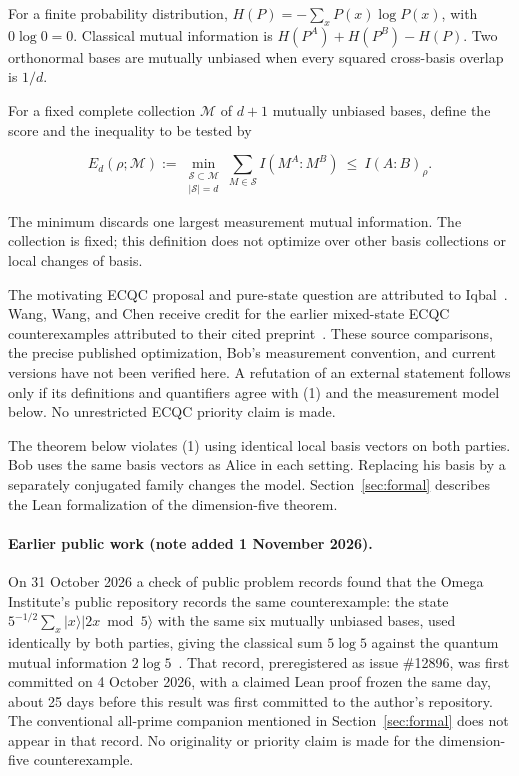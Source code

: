 \documentclass[11pt,a4paper]{article}
\begin{document}
For a finite probability distribution, $H(P)=-\sum_x P(x)\log P(x)$,
with $0\log0=0$. Classical mutual information is
$H(P^A)+H(P^B)-H(P)$. Two orthonormal bases are mutually unbiased when
every squared cross-basis overlap is $1/d$.

For a fixed complete collection \(\mathcal M\) of \(d+1\) mutually
unbiased bases, define the score and the inequality to be tested by

\[
 E_d(\rho;\mathcal M):=
 \min_{\substack{\mathcal S\subset\mathcal M\\|\mathcal S|=d}}
 \sum_{M\in\mathcal S}I(M^A:M^B)
 \ \le\ I(A:B)_\rho.
 \tag{1}
\]

The minimum discards one largest measurement mutual information. The
collection is fixed; this definition does not optimize over other basis
collections or local changes of basis.

The motivating ECQC proposal and pure-state question are attributed to
Iqbal~\cite{Iqbal}. Wang, Wang, and Chen receive credit for the earlier
mixed-state ECQC counterexamples attributed to their cited
preprint~\cite{WangECQC}. These source comparisons, the precise published
optimization, Bob's measurement convention, and current versions have
not been verified here. A refutation of an external statement follows
only if its definitions and quantifiers agree with (1) and the measurement
model below. No unrestricted ECQC priority claim is made.

The theorem below violates (1) using identical local basis vectors on
both parties. Bob uses the same basis vectors as Alice in each setting.
Replacing his basis by a separately conjugated family changes the model.
Section~\ref{sec:formal} describes the Lean formalization of the
dimension-five theorem.

\paragraph{Earlier public work (note added 1 November 2026).}
On 31 October 2026 a check of public problem records found that the Omega
Institute's public repository records the same counterexample: the state
$5^{-1/2}\sum_x|x\rangle|2x \bmod 5\rangle$ with the same six mutually
unbiased bases, used identically by both parties, giving the classical sum
$5\log5$ against the quantum mutual information
$2\log5$~\cite{OmegaECQC}. That record, preregistered as issue \#12896, was
first committed on 4 October 2026, with a claimed Lean proof frozen the
same day, about 25 days before this result was first committed to the
author's repository. The conventional all-prime companion mentioned in
Section~\ref{sec:formal} does not appear in that record. No originality or
priority claim is made for the dimension-five counterexample.
\end{document}
